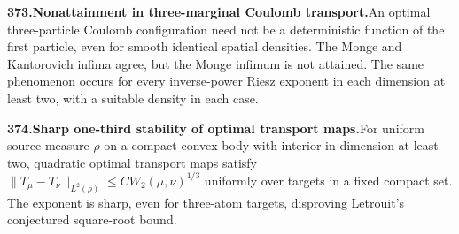 \documentclass[11pt,a4paper]{article}
\begin{document}
  \par \begin{minipage}{\linewidth}
  \fontsize{10.5}{12.6}\selectfont\RaggedRight
  \hypertarget{result 373}{}
  {\bfseries\textcolor{muted}{373.}\enspace Nonattainment in three-marginal Coulomb transport.}\enspace An optimal three-particle Coulomb configuration need not be a deterministic function of the first particle, even for smooth identical spatial densities. The Monge and Kantorovich infima agree, but the Monge infimum is not attained. The same phenomenon occurs for every inverse-power Riesz exponent in each dimension at least two, with a suitable density in each case.\par
  \end{minipage}\par\vspace{5pt}



  \par \begin{minipage}{\linewidth}
  \fontsize{10.5}{12.6}\selectfont\RaggedRight
  \hypertarget{result 374}{}
  {\bfseries\textcolor{muted}{374.}\enspace Sharp one-third stability of optimal transport maps.}\enspace For uniform source measure $\rho$ on a compact convex body with interior in dimension at least two, quadratic optimal transport maps satisfy $\|T_\mu-T_\nu\|_{L^2(\rho)}\le C W_2(\mu,\nu)^{1/3}$ uniformly over targets in a fixed compact set. The exponent is sharp, even for three-atom targets, disproving Letrouit's conjectured square-root bound.\par
  \end{minipage}\par\vspace{5pt}
\end{document}

